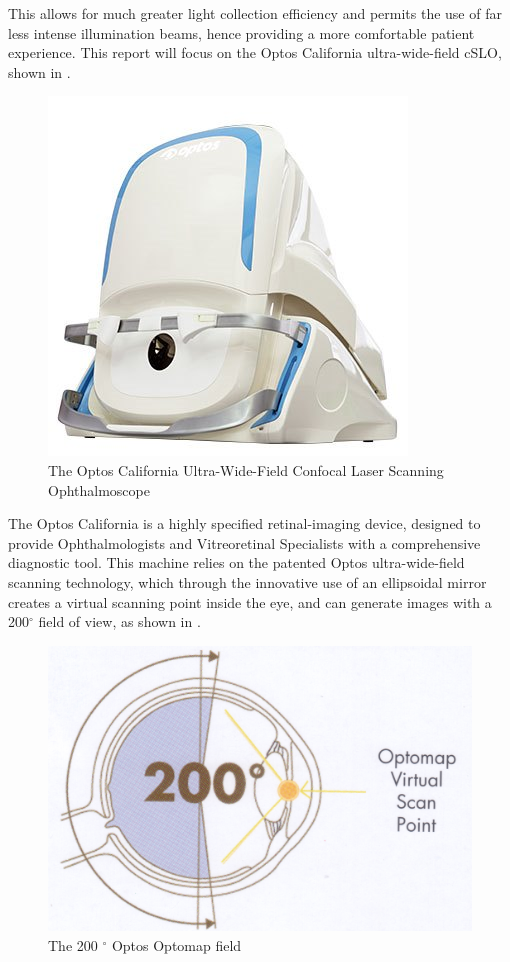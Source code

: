 This allows for much greater light collection efficiency and permits the use
of far less intense illumination beams, hence providing a more comfortable
patient experience.\cite{5_bennett_2015} This report will focus on the Optos
California ultra-wide-field cSLO, shown in .

\begin{figure}[htbp]
\centering
\includegraphics{figures/california}
\caption{The Optos California Ultra-Wide-Field Confocal Laser Scanning Ophthalmoscope}
\label{fig:cali}
   \end{figure}


The Optos California is a highly specified retinal-imaging device, designed to
provide Ophthalmologists and Vitreoretinal Specialists with a comprehensive
diagnostic tool. This machine relies on the patented Optos ultra-wide-field
scanning technology, which through the innovative use of an ellipsoidal mirror
creates a virtual scanning point inside the eye, and can generate images with
a 200$^\circ$ field of view, as shown in . 

\begin{figure}[htbp]
\centering
\includegraphics{figures/optoswide}
\caption{The 200 $^\circ$ Optos Optomap field}
\label{fig:wideview}
   \end{figure}

